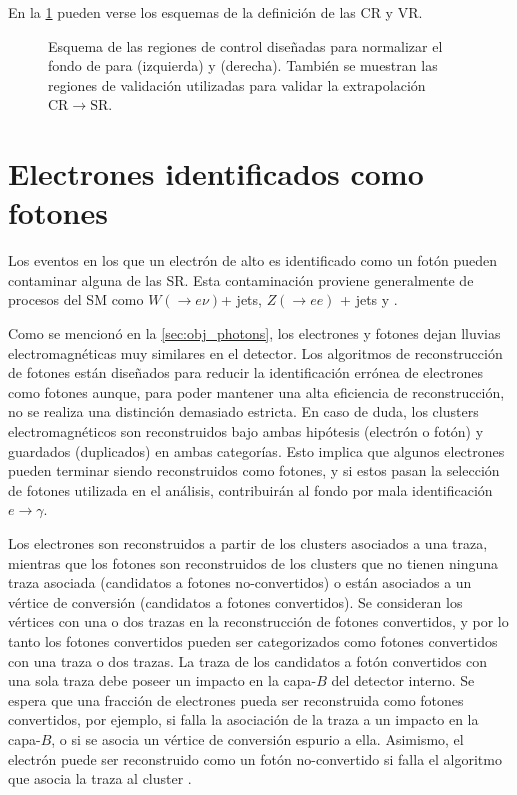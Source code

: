 En la \cref{fig:bkg_crq} pueden verse los esquemas de la definición de las CR y VR.

\begin{figure}[!htbp]
  \centering

  \resizebox{0.49\textwidth}{!}{}
  \resizebox{0.49\textwidth}{!}{}

  \caption{Esquema de las regiones de control diseñadas para normalizar el fondo
    de {\gjet} para {\SRL} (izquierda) y {\SRH} (derecha). También se muestran
    las regiones de validación utilizadas para validar la extrapolación
    $\mathrm{CR}\to\mathrm{SR}$.}
  \label{fig:bkg_crq}
\end{figure}



\section{Electrones identificados como fotones} \label{sec:efakes}

Los eventos en los que un electrón de alto {\pt} es identificado como un
fotón \cite{Bocci:1643300} pueden contaminar alguna de las SR. Esta contaminación
proviene generalmente de procesos del SM como $W(\to e\nu)$+ jets, $Z(\to ee)$ +
jets y {\ttbar}.

Como se mencionó en la \cref{sec:obj_photons}, los electrones y fotones dejan
lluvias electromagnéticas muy similares en el detector. Los algoritmos de
reconstrucción de fotones están diseñados para reducir la identificación errónea
de electrones como fotones aunque, para poder mantener una alta eficiencia de
reconstrucción, no se realiza una distinción demasiado estricta. En caso de
duda, los clusters electromagnéticos son reconstruidos bajo ambas hipótesis
(electrón o fotón) y guardados (duplicados) en ambas categorías. Esto implica
que algunos electrones pueden terminar siendo reconstruidos como fotones, y si
estos pasan la selección de fotones utilizada en el análisis, contribuirán al
fondo por mala identificación $e\to\gamma$.

Los electrones son reconstruidos a partir de los clusters asociados a una traza,
mientras que los fotones son reconstruidos de los clusters que no tienen ninguna
traza asociada (candidatos a fotones no-convertidos) o están asociados a un
vértice de conversión (candidatos a fotones convertidos). Se consideran los
vértices con una o dos trazas en la reconstrucción de fotones convertidos, y por
lo tanto los fotones convertidos pueden ser categorizados como fotones
convertidos con una traza o dos trazas. La traza de los candidatos a fotón
convertidos con una sola traza debe poseer un impacto en la capa-$B$ del detector
interno. Se
espera que una fracción de electrones pueda ser reconstruida como fotones
convertidos, por ejemplo, si falla la asociación de la traza a un impacto en la
capa-$B$, o si se asocia un vértice de conversión espurio a ella. Asimismo, el
electrón puede ser reconstruido como un fotón no-convertido si falla el
algoritmo que asocia la traza al cluster .

